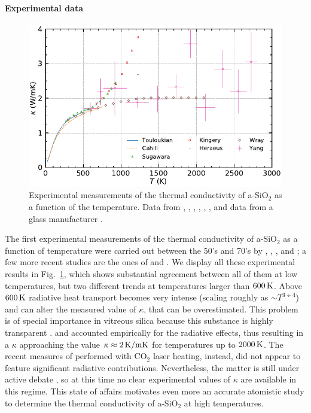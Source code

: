 \paragraph{Experimental data}
\begin{figure}
    \centering
    \includegraphics[width=\textwidth]{chapters/chapter6/figures/silica_expkappa.pdf}
    \caption{Experimental measurements of the thermal conductivity of a-SiO$_2$ as a function of the temperature. Data from \textcite{Touloukian1970}, \textcite{Cahill1990}, \textcite{Sugawara1969}, \textcite{Kingery1955}, \textcite{Wray1959}, \textcite{Yang2009}, and data from a glass manufacturer \cite{Heraeus2010}. 
    }
    \label{fig:silica-exp-kappa}
\end{figure}
The first experimental measurements of the thermal conductivity of a-SiO$_2$ as a function of temperature were carried out between the 50's and 70's by \textcite{Kingery1955}, \textcite{Wray1959}, \textcite{Sugawara1969}, and \textcite{Touloukian1970}; a few more recent studies are the ones of \textcite{Cahill1990} and \textcite{Yang2009}. 
We display all these experimental results in Fig.~\ref{fig:silica-exp-kappa}, which shows substantial agreement between all of them at low temperatures, but two different trends at temperatures larger than $600\,\mathrm{K}$. 
Above $600\,\mathrm{K}$ radiative heat transport becomes very intense (scaling roughly as $\sim T^{3\div 4}$) and can alter the measured value of $\kappa$, that can be overestimated. This problem is of special importance in vitreous silica because this substance is highly transparent \cite{Carwile1966, Cahill1990, Gardon1961}. \textcite{Cahill1990} and \textcite{Wray1959} accounted empirically for the radiative effects, thus resulting in a $\kappa$ approaching the value $\kappa\approx 2\,\mathrm{K/mK}$ for temperatures up to $2000\,\mathrm{K}$. The recent measures of \textcite{Yang2009} performed with CO$_2$ laser heating, instead, did not appear to feature significant radiative contributions. 
Nevertheless, the matter is still under active debate \cite{Bouchut2004}, so at this time no clear experimental values of $\kappa$ are available in this regime. This state of affairs motivates even more an accurate atomistic study to determine the thermal conductivity of a-SiO$_2$ at high temperatures. 

